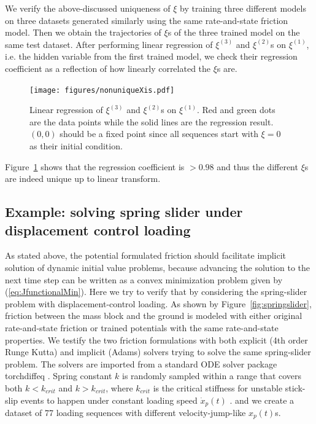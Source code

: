 We verify the above-discussed uniqueness of $\xi$ by training three different models on three datasets generated similarly using the same rate-and-state friction model. 
Then we obtain the trajectories of $\xi$s of the three trained model on the same test dataset. 
After performing linear regression of $\xi^{(3)}$ and $\xi^{(2)}$s on $\xi^{(1)}$, 
i.e. the hidden variable from the first trained model, 
we check their regression coefficient as a reflection of how linearly correlated the $\xi$s are. 

\begin{figure}[htbp]
    \centering
    \texttt{[image: figures/nonuniqueXis.pdf]}
    \caption{Linear regression of $\xi^{(3)}$ and $\xi^{(2)}$s on $\xi^{(1)}$. 
    Red and green dots are the data points while the solid lines are the regression result.
    $(0, 0)$ should be a fixed point since all sequences start with $\xi = 0$ as their initial condition.}
    \label{fig:nonuniqueXis}
\end{figure}

Figure~\ref{fig:nonuniqueXis} shows that the regression coefficient is $>0.98$ and thus the different $\xi$s are indeed unique up to linear transform.


\subsection{Example: solving spring slider under displacement control loading}
As stated above, 
the potential formulated friction should facilitate implicit solution of dynamic initial value problems, 
because advancing the solution to the next time step can be written as a convex minimization problem given by (\ref{eq:JfunctionalMin}). 
Here we try to verify that by considering the spring-slider problem with displacement-control loading. 
As shown by Figure~\ref{fig:springslider}, 
friction between the mass block and the ground is modeled with either original rate-and-state friction or trained potentials with the same rate-and-state properties. 
We testify the two friction formulations with both explicit (4th order Runge Kutta) and implicit (Adams) solvers trying to solve the same spring-slider problem. 
The solvers are imported from a standard ODE solver package torchdiffeq \cite{torchdiffeq}.
Spring constant $k$ is randomly sampled within a range that covers both $k < k_{crit}$ and $k > k_{crit}$, 
where $k_{crit}$ is the critical stiffness for unstable stick-slip events to happen under constant loading speed $\dot{x}_p(t)$ \cite{rice_stability_1983, Gu_Rice_1984}. 
and we create a dataset of 77 loading sequences with different velocity-jump-like $x_p(t)$s. 

